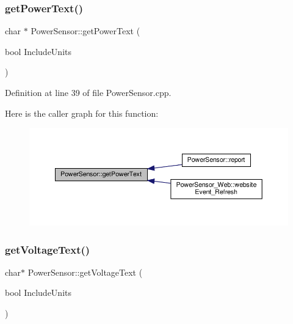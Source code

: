 \mbox{\label{class_power_sensor_ad1544079a0a3b7eafbb02411a2553cff}} 
\subsubsection{\texorpdfstring{get\+Power\+Text()}{getPowerText()}\hspace{0.1cm}{\footnotesize\ttfamily [2/2]}}
{\footnotesize\ttfamily char $\ast$ Power\+Sensor\+::get\+Power\+Text (\begin{DoxyParamCaption}\item[{bool}]{Include\+Units }\end{DoxyParamCaption})}



Definition at line 39 of file Power\+Sensor.\+cpp.

Here is the caller graph for this function\+:
\nopagebreak
\begin{figure}[H]
\begin{center}
\leavevmode
\includegraphics[width=350pt]{class_power_sensor_ad1544079a0a3b7eafbb02411a2553cff_icgraph}
\end{center}
\end{figure}
\mbox{\label{class_power_sensor_a571613e04e60736e92547eed90ee17e3}} 
\subsubsection{\texorpdfstring{get\+Voltage\+Text()}{getVoltageText()}\hspace{0.1cm}{\footnotesize\ttfamily [1/2]}}
{\footnotesize\ttfamily char$\ast$ Power\+Sensor\+::get\+Voltage\+Text (\begin{DoxyParamCaption}\item[{bool}]{Include\+Units }\end{DoxyParamCaption})}

